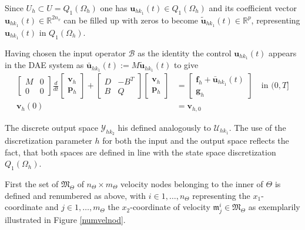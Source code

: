 \documentclass[a4paper,10pt,BCOR=15mm]{scrbook}
\begin{document}
Since $U_h \subset U = Q_1(\Omega_h)$ one has $\mathbf u_{hk_1}(t) \in Q_1(\Omega_h)$ and its coefficient vector $\mathbf u_{hk_1}(t) \in \mathbb R^{2n_v}$ can be filled up with zeros to become $\tilde {\mathbf u}_{hk_1}(t) \in \mathbb R^p$, representing $\mathbf u_{hk_1}(t)$ in $Q_1(\Omega_h)$. 

Having chosen the input operator $\mathcal B$ as the identity the control $\mathbf u_{hk_1}(t)$ appears in the DAE system as $\bar{ \mathbf u}_{hk_1}(t) := M\tilde {\mathbf u}_{hk_1}(t)$ to give
\begin{align*}
	\begin{bmatrix} M& 0 \\ 0& 0 \end{bmatrix} \frac{d}{dt} {\begin{bmatrix} \mathbf v_h \\ \mathbf p_h \end{bmatrix}} + \begin{bmatrix} D& -B^T \\  B& Q \end{bmatrix} \begin{bmatrix} \mathbf v_h \\ \mathbf p_h  \end{bmatrix}&= \begin{bmatrix} \mathbf f_h + \bar {\mathbf u}_{hk_1}(t)\\ \mathbf g_h \end{bmatrix} \quad \text{in  } (0,T] \\
\mathbf v_h(0) &= \mathbf v_{h,0}
\end{align*}

The discrete output space $\mathcal Y_{hk_2}$ his defined analogously to $\mathcal U_{hk_1}$. The use of the discretization parameter $h$ for both the input and the output space reflects the fact, that both spaces are defined in line with the state space discretization $Q_1(\Omega_h)$.

First the set of $\mathfrak M_\Theta$ of $n_\Theta \times m_\Theta$ velocity nodes belonging to the inner of $\Theta$ is defined and renumbered as above, with $i\in{1,\dotsc,n_\Theta}$ representing the $x_1$-coordinate and $j\in{1,\dotsc,m_\Theta}$ the $x_2$-coordinate of velocity $\mathfrak m_j^i \in \mathfrak M_\Theta$ as exemplarily illustrated in Figure \ref{numvelnod}. 
\end{document}
